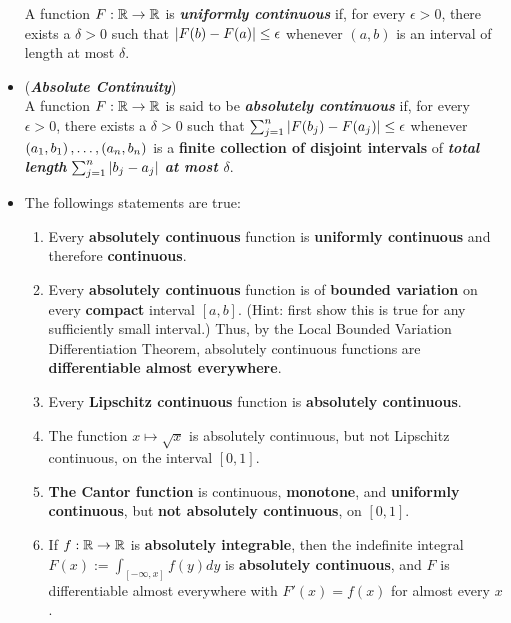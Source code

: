 \documentclass[11pt]{article}
\begin{document}
\begin{itemize}
\begin{definition}
A function $F : {\mathbb R} \rightarrow {\mathbb R}$ is \emph{\textbf{uniformly continuous}} if, for every $\epsilon > 0$, there exists a $\delta > 0$ such that $\left\lvert F(b) - F (a) \right\rvert \le \epsilon$ whenever $(a, b)$  is an interval of length at most $\delta$.
\end{definition}

\item \begin{definition} (\textbf{\emph{Absolute Continuity}})\\
A function $F : {\mathbb R} \rightarrow {\mathbb R}$ is said to be \textbf{\emph{absolutely continuous}} if, for every $\epsilon > 0$, there exists a $\delta > 0$ such that $\sum_{j=1}^{n}\left\lvert F(b_j) - F(a_j) \right\rvert \le \epsilon$ whenever $(a_1, b_1) \,{,}\ldots{,}\, (a_n, b_n)$ is a \textbf{finite collection of disjoint intervals} of \emph{\textbf{total length}} $\sum_{j=1}^{n}\left\lvert b_j - a_j \right\rvert$ \emph{\textbf{at most $\delta$}}.
\end{definition}

\item \begin{proposition} The followings statements are true:
\begin{enumerate}
\item Every \textbf{absolutely continuous} function is \textbf{uniformly continuous} and therefore \textbf{continuous}.

\item Every \textbf{absolutely continuous} function is of \textbf{bounded variation} on every \textbf{compact} interval $[a, b]$. (Hint: first show this is true for any sufficiently small interval.) Thus, by the Local Bounded Variation Differentiation Theorem, absolutely continuous functions are \textbf{differentiable almost everywhere}.

\item Every \textbf{Lipschitz continuous} function is \textbf{absolutely continuous}.

\item The function $x \mapsto \sqrt{x}$ is absolutely continuous, but not Lipschitz continuous, on the interval $[0, 1]$.

\item \textbf{The Cantor function} is continuous, \textbf{monotone}, and \textbf{uniformly continuous}, but \textbf{not absolutely continuous}, on $[0, 1]$.

\item  If $f: {\mathbb R} \rightarrow {\mathbb R}$ is \textbf{absolutely integrable}, then the indefinite integral $F(x) := \int_{[-\infty,x]} f(y) dy$ is \textbf{absolutely continuous}, and $F$ is differentiable almost everywhere with $F'(x) = f(x)$ for almost every $x$.


\end{enumerate}
\end{proposition}
\end{itemize}
\end{document}
